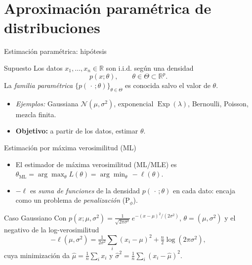 \documentclass[10pt,aspectratio=169]{beamer}
\newcommand{\R}{\mathbb{R}}
\newcommand{\0}{\mathbf{0}}
\newcommand{\1}{\mathbf{1}}
\newcommand{\Expon}{\operatorname{Exp}}
\begin{document}
\section{Aproximación paramétrica de distribuciones}
\begin{frame}{Estimación paramétrica: hipótesis}
  \begin{block}{Supuesto}
    Los datos $x_1,\dots,x_n\in\R$ son i.i.d. según una densidad
    \[
      p(x;\theta), \qquad \theta\in\Theta\subset\R^p.
    \]
    La \emph{familia paramétrica} $\{p(\,\cdot\,;\theta)\}_{\theta\in\Theta}$ es conocida
    salvo el valor de $\theta$.
  \end{block}
  \begin{itemize}
    \item \emph{Ejemplos:} Gaussiana $\mathcal{N}(\mu,\sigma^2)$,
          exponencial $\Expon(\lambda)$, Bernoulli, Poisson, mezcla finita.
    \item \textbf{Objetivo:} a partir de los datos, estimar $\theta$.
  \end{itemize}
\end{frame}

\begin{frame}{Estimación por máxima verosimilitud (ML)}
  \begin{itemize}
    \item El estimador de máxima verosimilitud (ML/MLE) es
      $\displaystyle \theta_{\mathrm{ML}} = \arg\max_\theta L(\theta)
       = \arg\min_\theta\, -\ell(\theta)$.
    \item $-\ell$ es \emph{suma de funciones} de la densidad $p(\,\cdot\,;\theta)$ en cada dato:
          encaja como un problema de \emph{penalización} (P$_\phi$).
  \end{itemize}
  \begin{alertblock}{Caso Gaussiano}
    Con $p(x;\mu,\sigma^2) = \tfrac{1}{\sqrt{2\pi\sigma^2}}\,e^{-(x-\mu)^2/(2\sigma^2)}$,
    $\theta = (\mu,\sigma^2)$ y el negativo de la log-verosimilitud
    \[
      -\ell(\mu,\sigma^2)=\tfrac{1}{2\sigma^2}\sum_i (x_i-\mu)^2 + \tfrac{n}{2}\log(2\pi\sigma^2),
    \]
    cuya minimización da
    $\hat\mu=\tfrac1n\sum_i x_i$ y
    $\hat\sigma^2=\tfrac1n\sum_i (x_i-\hat\mu)^2$.
  \end{alertblock}
\end{frame}
\end{document}
